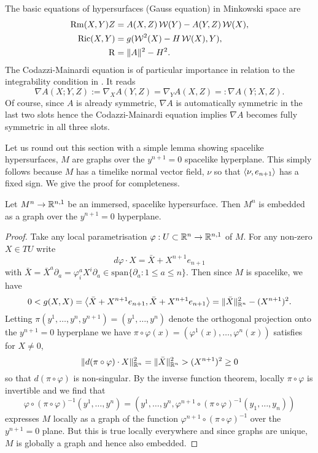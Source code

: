 \documentclass[a4paper, 12pt]{amsart}
\begin{document}
The basic equations of hypersurfaces (Gauss equation) in Minkowski space are
\begin{equation}
\label{eq:gauss}
\begin{split}
\operatorname{Rm}(X, Y) Z &= A(X, Z) \operatorname{\mathcal{W}}(Y) - A(Y, Z) \operatorname{\mathcal{W}}(X), \\
\operatorname{Ric}(X, Y) &= g(\operatorname{\mathcal{W}}^2(X) - H \operatorname{\mathcal{W}}(X), Y), \\
\operatorname{R} &= \|A\|^2 - H^2.
\end{split}
\end{equation}
The Codazzi-Mainardi equation is of particular importance in relation to the integrability condition in . It reads
\begin{equation}
\label{eq:codazzi}
\nabla A (X; Y, Z) := \nabla_X A (Y, Z) = \nabla_Y A(X, Z) =: \nabla A(Y; X, Z).
\end{equation}
Of course, since \(A\) is already symmetric, \(\nabla A\) is automatically symmetric in the last two slots hence the Codazzi-Mainardi equation implies \(\nabla A\) becomes fully symmetric in all three slots.

Let us round out this section with a simple lemma showing spacelike hypersurfaces, \(M\) are graphs over the \(y^{n+1} = 0\) spacelike hyperplane. This simply follows because \(M\) has a timelike normal vector field, \(\nu\) so that \(\left\langle \nu,e_{n+1} \right\rangle\) has a fixed sign. We give the proof for completeness.
\begin{lemma}
\label{lem:graph}
Let \(M^n \to \mathbb{R}^{n,1}\) be an immersed, spacelike hypersurface. Then \(M^n\) is embedded as a graph over the \(y^{n+1} = 0\) hyperplane.
\end{lemma}
\begin{proof}
Take any local parametrisation \(\varphi : U \subset \mathbb{R}^n \to \mathbb{R}^{n,1}\) of \(M\). For any non-zero \(X \in TU\) write
\[
d\varphi \cdot X = \bar{X} + X^{n+1} e_{n+1}
\]
with \(\bar{X} = \bar{X}^a \partial_a = \varphi^a_i X^i \partial_a \in \text{span} \{\partial_a : 1 \leq a \leq n\}\). Then since \(M\) is spacelike, we have
\[
0 < g(X, X) = \left\langle \bar{X} + X^{n+1} e_{n+1},\bar{X} + X^{n+1} e_{n+1} \right\rangle = \|\bar{X}\|_{\mathbb{R}^n}^2 - (X^{n+1})^2.
\]
Letting \(\pi(y^1, \ldots, y^n, y^{n+1}) = (y^1, \ldots, y^n)\) denote the orthogonal projection onto the \(y^{n+1} = 0\) hyperplane we have \(\pi \circ \varphi (x) = (\varphi^1(x), \ldots, \varphi^n(x))\) satisfies for \(X \ne 0\),
\[
\|d(\pi \circ \varphi) \cdot X\|_{\mathbb{R}^n}^2 = \|\bar{X}\|_{\mathbb{R}^n}^2  > (X^{n+1})^2 \geq 0
\]
so that \(d(\pi \circ \varphi)\) is non-singular. By the inverse function theorem, locally \(\pi \circ \varphi\) is invertible and we find that
\[
\varphi \circ (\pi \circ \varphi)^{-1} (y^1, \ldots, y^n) = (y^1, \ldots, y^n, \varphi^{n+1} \circ (\pi \circ \varphi)^{-1} (y_1, \ldots, y_n))
\]
expresses \(M\) locally as a graph of the function \(\varphi^{n+1} \circ (\pi \circ \varphi)^{-1}\) over the \(y^{n+1} = 0\) plane. But this is true locally everywhere and since graphs are unique, \(M\) is globally a graph and hence also embedded.
\end{proof}
\end{document}
